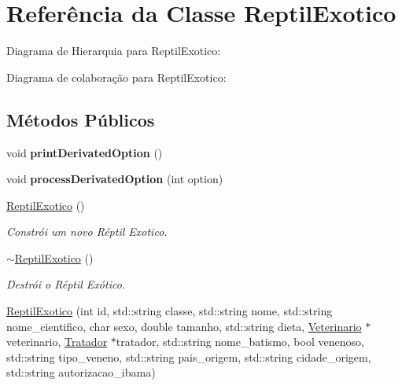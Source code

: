 \hypertarget{classReptilExotico}{}\section{Referência da Classe Reptil\+Exotico}
\label{classReptilExotico}


Diagrama de Hierarquia para Reptil\+Exotico\+:


Diagrama de colaboração para Reptil\+Exotico\+:
\subsection*{Métodos Públicos}
\begin{DoxyCompactItemize}
\item 
\mbox{\label{classReptilExotico_a2e380fba3b3e30f80957cb42fef883a0}} 
void {\bfseries print\+Derivated\+Option} ()
\item 
\mbox{\label{classReptilExotico_a76844690a470347871b7d5ce2a7bd321}} 
void {\bfseries process\+Derivated\+Option} (int option)
\item 
\mbox{\label{classReptilExotico_a0f9104f7cbed74d52a6711c03cd75003}} 
\hyperlink{classReptilExotico_a0f9104f7cbed74d52a6711c03cd75003}{Reptil\+Exotico} ()
\begin{DoxyCompactList}\small\item\em Constrói um novo Réptil Exotico. \end{DoxyCompactList}\item 
\mbox{\label{classReptilExotico_abddaff7d11fd31ce5fcd4a2c1b4ee6f1}} 
\hyperlink{classReptilExotico_abddaff7d11fd31ce5fcd4a2c1b4ee6f1}{$\sim$\+Reptil\+Exotico} ()
\begin{DoxyCompactList}\small\item\em Destrói o Réptil Exótico. \end{DoxyCompactList}\item 
\hyperlink{classReptilExotico_a116a23b987d0470f9631e04ee4c99a3b}{Reptil\+Exotico} (int id, std\+::string classe, std\+::string nome, std\+::string nome\+\_\+cientifico, char sexo, double tamanho, std\+::string dieta, \hyperlink{classVeterinario}{Veterinario} $\ast$veterinario, \hyperlink{classTratador}{Tratador} $\ast$tratador, std\+::string nome\+\_\+batismo, bool venenoso, std\+::string tipo\+\_\+veneno, std\+::string pais\+\_\+origem, std\+::string cidade\+\_\+origem, std\+::string autorizacao\+\_\+ibama)

\end{DoxyCompactItemize}
